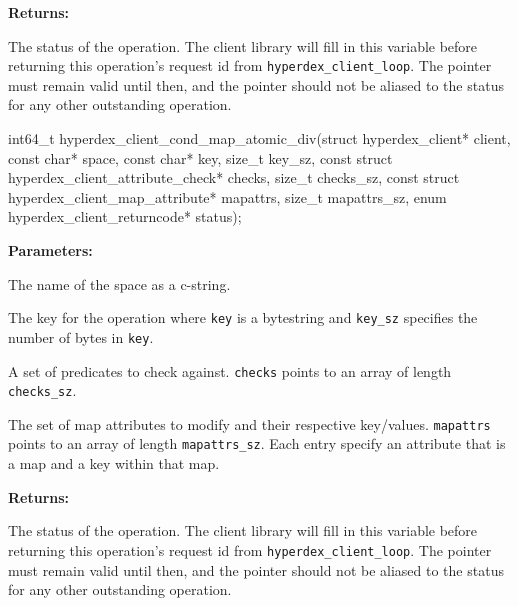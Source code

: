 \noindent\textbf{Returns:}
\begin{description}[labelindent=\widthof{{\texttt{status}}},leftmargin=*,noitemsep,nolistsep,align=right]
\item[\texttt{status}] The status of the operation.  The client library will fill in this variable before returning this operation's request id from \texttt{hyperdex\_client\_loop}.  The pointer must remain valid until then, and the pointer should not be aliased to the status for any other outstanding operation.
\end{description}

\funcsep
{}
\begin{ccode}
int64_t hyperdex_client_cond_map_atomic_div(struct hyperdex_client* client,
                const char* space,
                const char* key, size_t key_sz,
                const struct hyperdex_client_attribute_check* checks, size_t checks_sz,
                const struct hyperdex_client_map_attribute* mapattrs, size_t mapattrs_sz,
                enum hyperdex_client_returncode* status);
\end{ccode}
\funcdesc 

\noindent\textbf{Parameters:}
\begin{description}[labelindent=\widthof{{\texttt{mapattrs}, \texttt{mapattrs\_sz}}},leftmargin=*,noitemsep,nolistsep,align=right]
\item[\texttt{space}] The name of the space as a c-string.
\item[\texttt{key}, \texttt{key\_sz}] The key for the operation where \texttt{key} is a bytestring and \texttt{key\_sz} specifies the number of bytes in \texttt{key}.
\item[\texttt{checks}, \texttt{checks\_sz}] A set of predicates to check against.  \texttt{checks} points to an array of length \texttt{checks\_sz}.
\item[\texttt{mapattrs}, \texttt{mapattrs\_sz}] The set of map attributes to modify and their respective key/values.  \texttt{mapattrs} points to an array of length \texttt{mapattrs\_sz}.  Each entry specify an attribute that is a map and a key within that map.
\end{description}

\noindent\textbf{Returns:}
\begin{description}[labelindent=\widthof{{\texttt{status}}},leftmargin=*,noitemsep,nolistsep,align=right]
\item[\texttt{status}] The status of the operation.  The client library will fill in this variable before returning this operation's request id from \texttt{hyperdex\_client\_loop}.  The pointer must remain valid until then, and the pointer should not be aliased to the status for any other outstanding operation.
\end{description}

